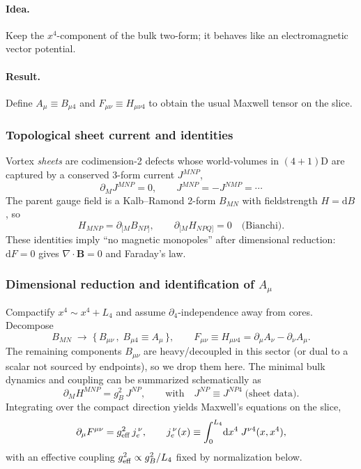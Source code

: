 \paragraph*{Idea.} Keep the $x^4$-component of the bulk two-form; it behaves like an electromagnetic vector potential.
\paragraph*{Result.} Define $A_\mu\equiv B_{\mu 4}$ and $F_{\mu\nu}\equiv H_{\mu\nu 4}$ to obtain the usual Maxwell tensor on the slice.

\subsubsection{Topological sheet current and identities}
Vortex \emph{sheets} are codimension-2 defects whose world-volumes in $(4{+}1)$D are captured by a conserved 3-form current $J^{MNP}$,
\begin{equation}
\partial_M J^{MNP}=0,
\qquad
J^{MNP}=-J^{NMP}=\cdots
\end{equation}
The parent gauge field is a Kalb--Ramond 2-form $B_{MN}$ with fieldstrength $H=\mathrm d B$, so
\begin{equation}
H_{MNP}=\partial_{[M}B_{NP]},
\qquad
\partial_{[M}H_{NPQ]}=0\quad\text{(Bianchi)}.
\end{equation}
These identities imply ``no magnetic monopoles'' after dimensional reduction: $\mathrm d F=0$ gives $\nabla\!\cdot\!\mathbf B=0$ and Faraday's law.

\subsubsection{Dimensional reduction and identification of $A_\mu$}
Compactify $x^4\sim x^4+L_4$ and assume $\partial_4$-independence away from cores. Decompose
\begin{equation}
B_{MN}\;\longrightarrow\;\{\,B_{\mu\nu}\,,\;B_{\mu 4}\equiv A_\mu\,\},
\qquad
F_{\mu\nu}\equiv H_{\mu\nu 4}
=\partial_\mu A_\nu-\partial_\nu A_\mu.
\end{equation}
The remaining components $B_{\mu\nu}$ are heavy/decoupled in this sector (or dual to a scalar not sourced by endpoints), so we drop them here. The minimal bulk dynamics and coupling can be summarized schematically as
\begin{equation}
\partial_M H^{MNP}=g_B^{2}\,J^{NP},\qquad \text{with}\quad J^{NP}\equiv J^{NP4} \;\text{(sheet data)}.
\end{equation}
Integrating over the compact direction yields Maxwell's equations on the slice,
\begin{equation}
\partial_\mu F^{\mu\nu}=g_{\rm eff}^2\, j_e^{\,\nu},
\qquad
j_e^{\,\nu}(x)\equiv \int_0^{L_4}\!\mathrm d x^4\; J^{\nu 4}(x,x^4),
\label{eq:maxwell-from-sheets}
\end{equation}
with an effective coupling $g_{\rm eff}^2\propto g_B^2/L_4$ fixed by normalization below.

